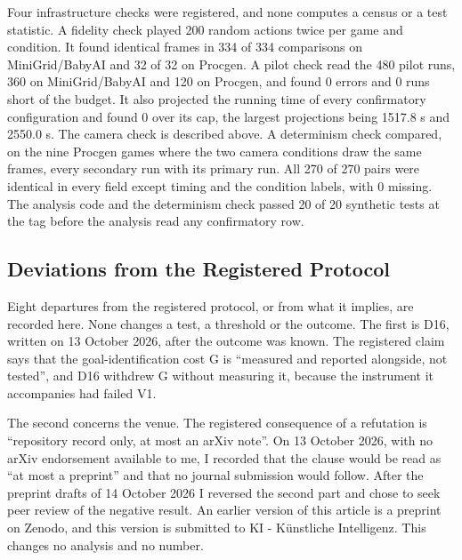 \documentclass[twocolumn]{svjour3}
\begin{document}
Four infrastructure checks were registered, and none computes a census
or a test statistic. A fidelity check played 200 random actions twice
per game and condition. It found identical frames in 334 of 334
comparisons on MiniGrid/BabyAI and 32 of 32 on Procgen. A pilot check
read the 480 pilot runs, 360 on MiniGrid/BabyAI and 120 on Procgen, and
found 0 errors and 0 runs short of the budget. It also projected the
running time of every confirmatory configuration and found 0 over its
cap, the largest projections being 1517.8 s and 2550.0 s. The camera
check is described above. A determinism check compared, on the nine
Procgen games where the two camera conditions draw the same frames,
every secondary run with its primary run. All 270 of 270 pairs were
identical in every field except timing and the condition labels, with 0
missing. The analysis code and the determinism check passed 20 of 20
synthetic tests at the tag before the analysis read any confirmatory
row.

\subsection{Deviations from the Registered Protocol}\label{sec:dev}

Eight departures from the registered protocol, or from what it implies,
are recorded here. None changes a test, a threshold or the outcome. The
first is D16, written on 13 October 2026, after the outcome was known.
The registered claim says that the goal-identification cost G is
``measured and reported alongside, not tested'', and D16 withdrew G
without measuring it, because the instrument it accompanies had failed
V1.

The second concerns the venue. The registered consequence of a
refutation is ``repository record only, at most an arXiv note''. On 13
October 2026, with no arXiv endorsement available to me, I recorded that
the clause would be read as ``at most a preprint'' and that no journal
submission would follow. After the preprint drafts of 14 October 2026 I
reversed the second part and chose to seek peer review of the negative
result. An earlier version of this article is a preprint on Zenodo, and
this version is submitted to KI - Künstliche Intelligenz. This changes
no analysis and no number.
\end{document}
